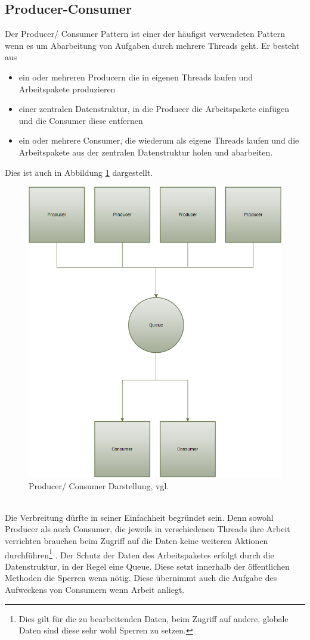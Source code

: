 \subsection{Producer-Consumer}\label{sec:producerconsumer}
Der Producer/ Consumer Pattern ist einer der häufigst verwendeten Pattern wenn es um Abarbeitung von Aufgaben durch mehrere Threads geht. Er besteht aus 
\begin{itemize}
	\item ein oder mehreren Producern die in eigenen Threads laufen und Arbeitspakete produzieren
	\item einer zentralen Datenstruktur, in die Producer die Arbeitspakete einfügen und die Consumer diese entfernen
	\item ein oder mehrere Consumer, die wiederum als eigene Threads laufen und die Arbeitspakete aus der zentralen Datenstruktur holen und abarbeiten.
\end{itemize}
Dies ist auch in Abbildung \ref{fig:architecture} dargestellt.\parencite{jthreads}
\begin{figure}
	\centering
	\includegraphics[width=0.7\linewidth]{images/B2_Producer_Consumer_1}
	\caption{Producer/ Consumer Darstellung, vgl. \parencite[S. 163]{jthreads}}
	\label{fig:architecture}
\end{figure}
\\Die Verbreitung dürfte in seiner Einfachheit begründet sein. Denn sowohl Producer als auch Consumer, die jeweils in verschiedenen Threads ihre Arbeit verrichten brauchen beim Zugriff auf die Daten keine weiteren Aktionen durchführen\footnote{Dies gilt für die zu bearbeitenden Daten, beim Zugriff auf andere, globale Daten sind diese sehr wohl Sperren zu setzen.} \parencite[S. 163ff]{jthreads}. Der Schutz der Daten des Arbeitspaketes erfolgt durch die Datenstruktur, in der Regel eine Queue. Diese setzt innerhalb der öffentlichen Methoden die Sperren wenn nötig. Diese übernimmt auch die Aufgabe des Aufweckens von Consumern wenn Arbeit anliegt.
